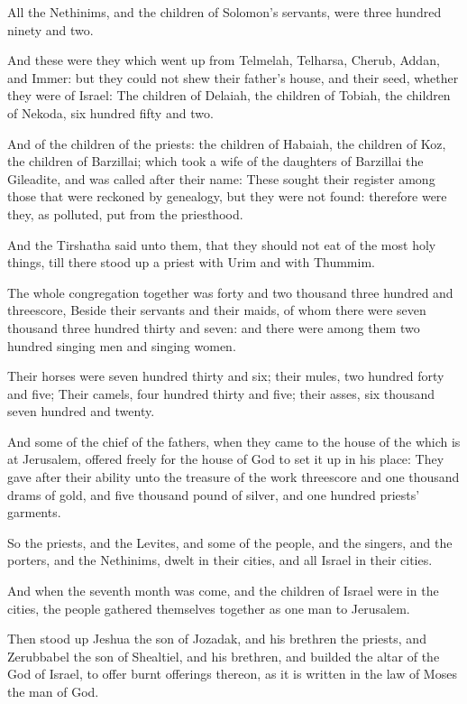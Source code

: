 \Verse All the Nethinims, and the children of Solomon's servants, were three hundred ninety and two.

\Verse And these were they which went up from Telmelah, Telharsa, Cherub, Addan, and Immer: but they could not shew their father's house, and their seed, whether they were of Israel: \Verse The children of Delaiah, the children of Tobiah, the children of Nekoda, six hundred fifty and two.

\Verse And of the children of the priests: the children of Habaiah, the children of Koz, the children of Barzillai; which took a wife of the daughters of Barzillai the Gileadite, and was called after their name: \Verse These sought their register among those that were reckoned by genealogy, but they were not found: therefore were they, as polluted, put from the priesthood.

\Verse And the Tirshatha said unto them, that they should not eat of the most holy things, till there stood up a priest with Urim and with Thummim.

\Verse The whole congregation together was forty and two thousand three hundred and threescore, \Verse Beside their servants and their maids, of whom there were seven thousand three hundred thirty and seven: and there were among them two hundred singing men and singing women.

\Verse Their horses were seven hundred thirty and six; their mules, two hundred forty and five; \Verse Their camels, four hundred thirty and five; their asses, six thousand seven hundred and twenty.

\Verse And some of the chief of the fathers, when they came to the house of the \LORD which is at Jerusalem, offered freely for the house of God to set it up in his place: \Verse They gave after their ability unto the treasure of the work threescore and one thousand drams of gold, and five thousand pound of silver, and one hundred priests' garments.

\Verse So the priests, and the Levites, and some of the people, and the singers, and the porters, and the Nethinims, dwelt in their cities, and all Israel in their cities.


\Chapter
\Verse And when the seventh month was come, and the children of Israel were in the cities, the people gathered themselves together as one man to Jerusalem.

\Verse Then stood up Jeshua the son of Jozadak, and his brethren the priests, and Zerubbabel the son of Shealtiel, and his brethren, and builded the altar of the God of Israel, to offer burnt offerings thereon, as it is written in the law of Moses the man of God.

